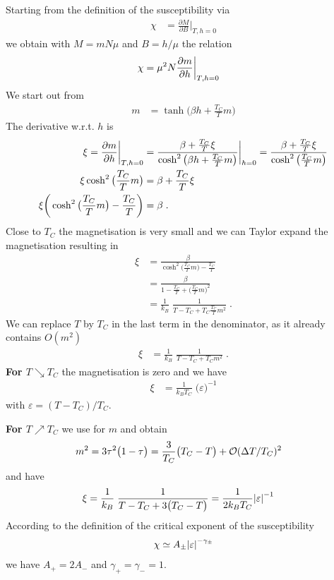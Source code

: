 Starting from the definition of the susceptibility via
%
\begin{align*}
\chi &= \frac{\partial M}{\partial B}\bigg|_{T,h=0}
\end{align*}
%
we obtain with $M=m N\mu$ and $B=h/\mu$ the relation 
%
\begin{align*}
\chi &= \mu^{2} N\frac{\partial m}{\partial h}\bigg|_{T,h=0}
\end{align*}
We start out from 
%
\begin{align*}
m &= \tanh\big(\beta h  +  \frac{T_{C}}{T} m\big)
\end{align*}
%
The derivative w.r.t. $h$ is
%
\begin{align*}
\xi=\frac{\partial m}{\partial h}\bigg|_{T, h=0} &=
\frac{\beta + \frac{T_{C}}{T} \xi}{\cosh^{2}\big( \beta h  +  \frac{T_{C}}{T} m \big)}\bigg|_{h=0}=
\frac{\beta + \frac{T_{C}}{T} \xi}{\cosh^{2}\big(\frac{T_{C}}{T} m \big)}\\
\xi \cosh^{2}\big(\frac{T_{C}}{T} m \big) &= \beta+ \frac{T_{C}}{T} \xi \\
\xi\bigg( \cosh^{2}\big(\frac{T_{C}}{T} m \big) - \frac{T_{C}}{T} \bigg) &= \beta\;.
\end{align*}
%
Close to $T_{C}$ the magnetisation is very small and we can Taylor expand the magnetisation
resulting in
%
\begin{align*}
\xi &= \frac{\beta}{ \cosh^{2}\big(\frac{T_{C}}{T} m \big) - \frac{T_{C}}{T} }\\
 &= \frac{\beta}{ 1 - \frac{T_{C}}{T} + \big( \frac{T_{C}}{T} m \big)^{2}}\\
 &= \frac{1}{k_{B}}\;\frac{1}{ T - T_{C}+  T_{C} \frac{T_{C}}{T} m^{2} }\;.
\end{align*}
%
We can replace $T$ by $T_{C}$ in the last term in the denominator, as it already contains $O(m^{2})$
%
\begin{align*}
\xi &= \frac{1}{k_{B}}\;\frac{1}{ T - T_{C}+  T_{C}  m^{2} }\;.
\end{align*}
%
{\bf For $T\searrow T_{C}$} the magnetisation is zero and we have 
\begin{align*}
\xi &= \frac{1}{k_{B} T_{C}} \;\big(\varepsilon\big)^{-1}
\end{align*}
with $\varepsilon=(T-T_{C})/T_{C}$.

\noindent
{\bf For $T\nearrow T_{C}$}  
we use   for $m$ and obtain 
%
\begin{align*}
m^{2} &= 3 \tau^{2}\big( 1-\tau \big) = \frac{3}{T_{C}} \big( T_{C}-T \big) + {\cal O}(\Delta T/T_{C})^{2}
\end{align*}
%
and have
%
\begin{align*}
\xi &= \frac{1}{k_{B}}\;\frac{1}{ T - T_{C}+ 3  \big( T_{C}-T \big) }
= \frac{1}{2 k_{B}T_{C}}\abs{\varepsilon}^{-1}
\end{align*}
According to the definition of the critical exponent of the susceptibility 
%
\begin{align*}
\chi \simeq A_{\pm } \abs{\varepsilon}^{-\gamma_{\pm}}
\end{align*}
%
we have $A_{+}= 2 A_{-}$ and $\gamma_{+}=\gamma_{-}=1$.
%
